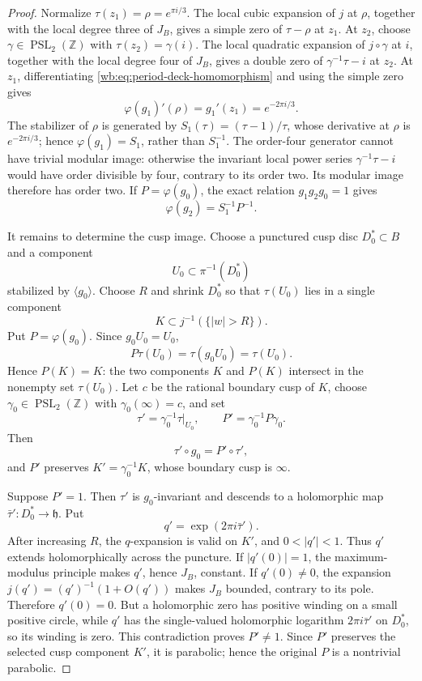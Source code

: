 \begin{proof}
Normalize \(\tau(z_1)=\rho=e^{\pi i/3}\).  The local cubic expansion of
\(j\) at \(\rho\), together with the local degree three of \(J_B\), gives a
simple zero of \(\tau-\rho\) at \(z_1\).  At \(z_2\), choose
\(\gamma\in\operatorname{PSL}_2(\mathbb Z)\) with
\(\tau(z_2)=\gamma(i)\).  The local quadratic expansion of
\(j\circ\gamma\) at \(i\), together with the local degree four of \(J_B\),
 gives a double zero of \(\gamma^{-1}\tau-i\) at \(z_2\).  At \(z_1\),
 differentiating \cref{wb:eq:period-deck-homomorphism} and using the simple
 zero gives
 \[
  \varphi(g_1)'(\rho)=g_1'(z_1)=e^{-2\pi i/3}.
 \]
 The stabilizer of \(\rho\) is generated by
 \(S_1(\tau)=(\tau-1)/\tau\), whose derivative at \(\rho\) is
 \(e^{-2\pi i/3}\); hence \(\varphi(g_1)=S_1\), rather than \(S_1^{-1}\).
 The order-four generator cannot have trivial modular image:
otherwise the invariant local power series \(\gamma^{-1}\tau-i\) would have
order divisible by four, contrary to its order two.  Its modular image
 therefore has order two.  If \(P=\varphi(g_0)\), the exact relation
 \(g_1g_2g_0=1\) gives
 \begin{equation}
  \varphi(g_2)=S_1^{-1}P^{-1}.
 \label{wb:eq:period-second-generator-from-cusp}
 \end{equation}

It remains to determine the cusp image.  Choose a punctured cusp disc
\(D_0^*\subset B\) and a component
\[
 U_0\subset\pi^{-1}(D_0^*)
\]
stabilized by \(\langle g_0\rangle\).  Choose \(R\) and shrink \(D_0^*\) so
that \(\tau(U_0)\) lies in a single component
\[
 K\subset j^{-1}(\{|w|>R\}).
\]
Put \(P=\varphi(g_0)\).  Since \(g_0U_0=U_0\),
\[
 P\tau(U_0)=\tau(g_0U_0)=\tau(U_0).
\]
Hence \(P(K)=K\): the two components \(K\) and \(P(K)\) intersect in the
nonempty set \(\tau(U_0)\).  Let \(c\) be the rational boundary cusp of
\(K\), choose
\(\gamma_0\in\operatorname{PSL}_2(\mathbb Z)\) with
\(\gamma_0(\infty)=c\), and set
\[
 \tau'=\gamma_0^{-1}\tau|_{U_0},\qquad
 P'=\gamma_0^{-1}P\gamma_0.
\]
Then
\[
 \tau'\circ g_0=P'\circ\tau',
\]
and \(P'\) preserves \(K'=\gamma_0^{-1}K\), whose boundary cusp is
\(\infty\).

Suppose \(P'=1\).  Then \(\tau'\) is \(g_0\)-invariant and descends to a
holomorphic map \(\bar\tau':D_0^*\to\mathfrak h\).  Put
\[
 q'=\exp(2\pi i\bar\tau').
\]
After increasing \(R\), the \(q\)-expansion is valid on \(K'\), and
\(0<|q'|<1\).  Thus \(q'\) extends holomorphically across the puncture.
If \(|q'(0)|=1\), the maximum-modulus principle makes \(q'\), hence
\(J_B\), constant.  If \(q'(0)\ne0\), the expansion
\(j(q')=(q')^{-1}(1+O(q'))\) makes \(J_B\) bounded, contrary to its pole.
Therefore \(q'(0)=0\).  But a holomorphic zero has positive winding on a
small positive circle, while \(q'\) has the single-valued holomorphic
logarithm \(2\pi i\bar\tau'\) on \(D_0^*\), so its winding is zero.  This
contradiction proves \(P'\ne1\).  Since \(P'\) preserves the selected cusp
component \(K'\), it is parabolic; hence the original \(P\) is a nontrivial
parabolic.


\end{proof}
